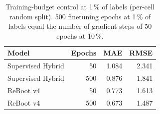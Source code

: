 \begin{table}[t]
\centering
\caption{Training-budget control at 1\,\% of labels (per-cell random split). 500 finetuning epochs at 1\,\% of labels equal the number of gradient steps of 50 epochs at 10\,\%.}
\label{tab:control}
\begin{tabular}{lrrr}
\toprule
Model & Epochs & MAE & RMSE \\
\midrule
Supervised Hybrid & 50 & 1.084 & 2.341 \\
Supervised Hybrid & 500 & 0.876 & 1.841 \\
ReBoot v4 & 50 & 0.773 & 1.613 \\
ReBoot v4 & 500 & 0.673 & 1.487 \\
\bottomrule
\end{tabular}
\end{table}